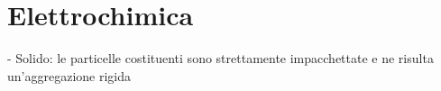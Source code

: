 \section{Elettrochimica}
- Solido: le particelle costituenti sono strettamente impacchettate e ne risulta un'aggregazione rigida
